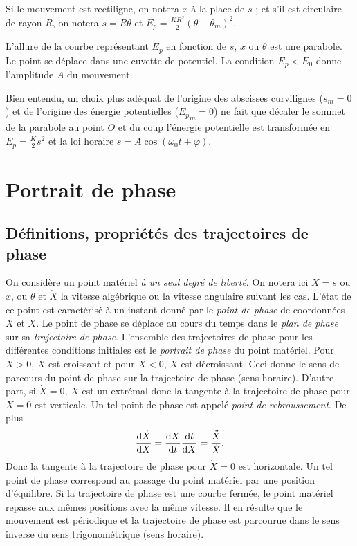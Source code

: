 Si le mouvement est rectiligne, on notera \(x\) à la place de \(s\) ; et s'il 
est circulaire de rayon \(R\), on notera \(s=R\theta\) et \(E_p = 
\frac{KR^2}{2}(\theta-\theta_m)^2\).

L'allure de la courbe représentant \(E_p\) en fonction de \(s\), \(x\) ou 
\(\theta\) est une parabole. Le point se déplace dans une cuvette de potentiel. 
La condition \(E_p < E_0\) donne l'amplitude \(A\) du mouvement.

Bien entendu, un choix plus adéquat de l'origine des abscisses curvilignes 
(\(s_m=0\)) et de l'origine des énergie potentielles (\({E_p}_m=0\)) ne fait 
que décaler le sommet de la parabole au point \(O\) et du coup l'énergie 
potentielle est transformée en \(E_p = \frac{K}{2}s^2\) et la loi horaire 
\(s=A\cos(\omega_0 t +\varphi)\).

\section{Portrait de phase}%
\label{chap5-sec:portratitdephase}%
%
\subsection{Définitions, propriétés des trajectoires de phase}%
\label{chap5-subsec:trajectoiresdephase}%
%
On considère un point matériel \emph{à un seul degré de liberté}. On notera ici 
\(X=s\) ou \(x\), ou \(\theta\) et \(\dot{X}\) la vitesse algébrique ou la 
vitesse angulaire suivant les cas. L'état de ce point est caractérisé à un 
instant donné par le \emph{point de phase} de coordonnées \(X\) et \(\dot{X}\). 
Le point de phase se déplace au cours du temps dans le \emph{plan de phase} sur 
sa \emph{trajectoire de phase}. L'ensemble des trajectoires de phase pour les 
différentes conditions initiales est le \emph{portrait de phase} du point 
matériel. Pour \(\dot{X}>0\), \(X\) est croissant et pour \(\dot{X}<0\), \(X\) 
est décroissant. Ceci donne le sens de parcours du point de phase sur la 
trajectoire de phase (sens horaire). D'autre part, si \(\dot{X}=0\), \(X\) est 
un extrémal donc la tangente à la trajectoire de phase pour \(\dot{X}=0\) est 
verticale. Un tel point de phase est appelé \emph{point de rebroussement}. De 
plus
\begin{equation}%
  \derived{\dot{X}}{X} = \derived{X}{t} \derived{t}{X} = 
  \frac{\ddot{X}}{\dot{X}}.
\end{equation}%
Donc la tangente à la trajectoire de phase pour \(\dot{X}=0\) est horizontale. 
Un tel point de phase correspond au passage du point matériel par une position 
d'équilibre. Si la trajectoire de phase est une courbe fermée, le point 
matériel repasse aux mêmes positions avec la même vitesse. Il en résulte que le 
mouvement est périodique et la trajectoire de phase est parcourue dans le sens 
inverse du sens trigonométrique (sens horaire).
%

